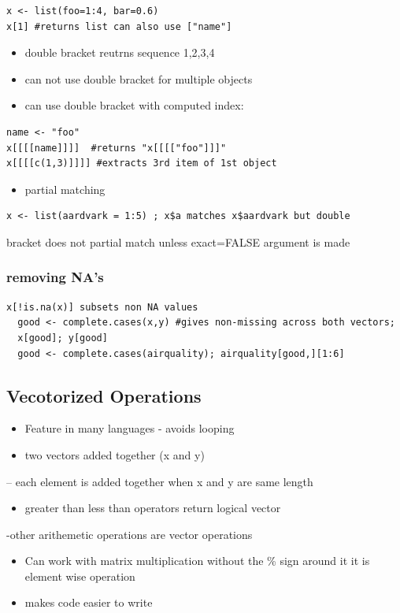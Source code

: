 \documentclass[11pt]{article}
\begin{document}
\begin{verbatim}
x <- list(foo=1:4, bar=0.6)
x[1] #returns list can also use ["name"]
\end{verbatim}
\begin{itemize}
\item double bracket reutrns sequence 1,2,3,4
\item can not use double bracket for multiple objects
\item can use double bracket with computed index:
\end{itemize}


\begin{verbatim}
name <- "foo"
x[[[[name]]]]  #returns "x[[[["foo"]]]"
x[[[[c(1,3)]]]] #extracts 3rd item of 1st object
\end{verbatim}

\begin{itemize}
\item partial matching
\end{itemize}

\begin{verbatim}
x <- list(aardvark = 1:5) ; x$a matches x$aardvark but double
\end{verbatim}

bracket does not partial match unless exact=FALSE argument is made
\subsubsection{removing NA's}
\label{sec-1-5-4}


\begin{verbatim}
x[!is.na(x)] subsets non NA values
  good <- complete.cases(x,y) #gives non-missing across both vectors;
  x[good]; y[good]
  good <- complete.cases(airquality); airquality[good,][1:6]
\end{verbatim}
\subsection{Vecotorized Operations}
\label{sec-1-6}

\begin{itemize}
\item Feature in many languages - avoids looping
\item two vectors added together (x and y)
\end{itemize}
-- each element is added together when x and y are same length
\begin{itemize}
\item greater than less than operators return logical vector
\end{itemize}
-other arithemetic operations are vector operations
\begin{itemize}
\item Can work with matrix multiplication without the \% sign around it it
  is element wise operation
\item makes code easier to write
\end{itemize}
\end{document}
